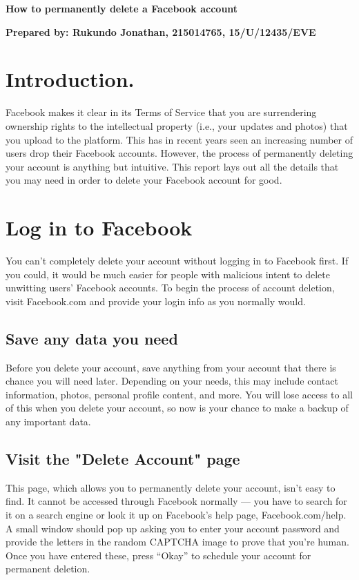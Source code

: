 \documentclass[options]{article}
\begin{document}
\textbf{How to permanently delete a Facebook account}

{\textbf{Prepared by: Rukundo Jonathan, 215014765, 15/U/12435/EVE
}}

\section{\textbf{Introduction.}} 
Facebook makes it clear in its Terms of Service that you are surrendering ownership rights to the intellectual property (i.e., your updates and photos) that you upload to the platform. This has in recent years seen an increasing number of users drop their Facebook accounts.
However, the process of permanently deleting your account is anything but intuitive. This report lays out all the details that you may need in order to delete your Facebook account for good.

\section{\textbf{Log in to Facebook}} 
You can't completely delete your account without logging in to Facebook first. If you could, it would be much easier for people with malicious intent to delete unwitting users' Facebook accounts. To begin the process of account deletion, visit Facebook.com and provide your login info as you normally would.

\subsection{\textbf{Save any data you need}}
Before you delete your account, save anything from your account that there is chance you will need later. Depending on your needs, this may include contact information, photos, personal profile content, and more. You will lose access to all of this when you delete your account, so now is your chance to make a backup of any important data.

\subsection{\textbf{Visit the "Delete Account" page}}
This page, which allows you to permanently delete your account, isn't easy to find. It cannot be accessed through Facebook normally — you have to search for it on a search engine or look it up on Facebook's help page, Facebook.com/help. 
A small window should pop up asking you to enter your account password and provide the letters in the random CAPTCHA image to prove that you're human. Once you have entered these, press “Okay” to schedule your account for permanent deletion.
\end{document}
